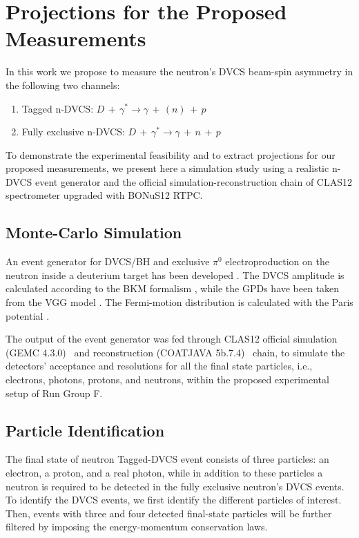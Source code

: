 \chapter{Projections for the Proposed Measurements}
\label{chap:reach}
In this work we propose to measure the neutron's DVCS beam-spin asymmetry in 
the following two channels:
\begin{enumerate}
   \item Tagged n-DVCS: $D\,+\,\gamma^{*}  \longrightarrow 
      \gamma\,+\,(n)\,+\,p$
   \item Fully exclusive n-DVCS: $D\,+\,\gamma^{*}  \longrightarrow \gamma\,+\, 
      n \,+\,p$
\end{enumerate}

To demonstrate the experimental feasibility and to extract projections for our 
proposed measurements, we present here a simulation study using a realistic 
n-DVCS event generator and the official simulation-reconstruction chain of 
CLAS12 spectrometer upgraded with BONuS12 RTPC. 


\section{Monte-Carlo Simulation}
An event generator for DVCS/BH and exclusive $\pi^0$ electroproduction on the 
neutron inside a deuterium target has been developed \cite{ahmed}. The DVCS 
amplitude is calculated according to the BKM formalism \cite{Belitsky:2001ns}, 
while the GPDs have been taken from the VGG model 
\cite{PhysRevD.60.094017,Guidal:2004nd}. The Fermi-motion distribution is 
calculated with the Paris potential \cite{PhysRevC.21.861}.

The output of the event generator was fed through CLAS12 official simulation 
(GEMC 4.3.0)~\cite{clas12-gemc} and reconstruction (COATJAVA 
5b.7.4)~\cite{clas12-coatjava} chain, to simulate the detectors' acceptance and 
resolutions for all the final state particles, i.e., electrons, photons, 
protons, and neutrons, within the proposed experimental setup of Run Group F.  

\section{Particle Identification}

The final state of neutron Tagged-DVCS event consists of three particles: an 
electron, a proton, and a real photon, while in addition to these particles a 
neutron is required to be detected in the fully exclusive neutron's DVCS 
events. To identify the DVCS events, we first identify the different particles 
of interest. Then, events with three and four detected final-state particles 
will be further filtered by imposing the energy-momentum conservation laws.


